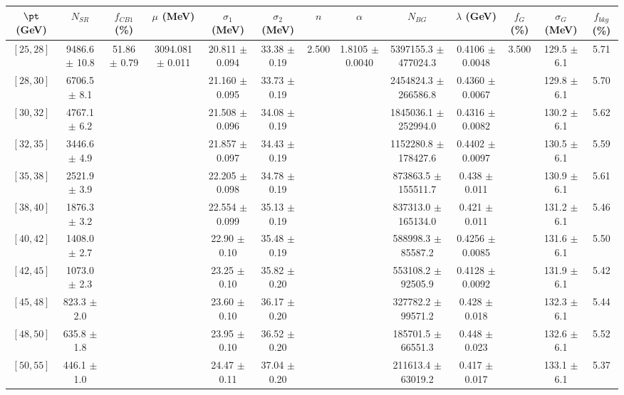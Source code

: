 \begin{tabular}{c||c|c|c|c|c|c|c|c|c|c|c||c}
$\pt$ (GeV) & $N_{SR}$ & $f_{CB1}$ (\%) & $\mu$ (MeV) & $\sigma_1$ (MeV) & $\sigma_2$ (MeV) & $n$ & $\alpha$ & $N_{BG}$ & $\lambda$ (GeV) & $f_G$ (\%) & $\sigma_G$ (MeV) & $f_{bkg}$ (\%) \\
\hline
$[25, 28]$ & 9486.6 $\pm$ 10.8 & \multirow{19}{*}{51.86 $\pm$ 0.79} & \multirow{19}{*}{3094.081 $\pm$ 0.011} & 20.811 $\pm$ 0.094 & 33.38 $\pm$ 0.19 & \multirow{19}{*}{2.500} & \multirow{19}{*}{1.8105 $\pm$ 0.0040} & 5397155.3 $\pm$ 477024.3 & 0.4106 $\pm$ 0.0048 & \multirow{19}{*}{3.500} & 129.5 $\pm$ 6.1 & 5.71\\
$[28, 30]$ & 6706.5 $\pm$ 8.1 &  &  & 21.160 $\pm$ 0.095 & 33.73 $\pm$ 0.19 &  &  & 2454824.3 $\pm$ 266586.8 & 0.4360 $\pm$ 0.0067 &  & 129.8 $\pm$ 6.1 & 5.70\\
$[30, 32]$ & 4767.1 $\pm$ 6.2 &  &  & 21.508 $\pm$ 0.096 & 34.08 $\pm$ 0.19 &  &  & 1845036.1 $\pm$ 252994.0 & 0.4316 $\pm$ 0.0082 &  & 130.2 $\pm$ 6.1 & 5.62\\
$[32, 35]$ & 3446.6 $\pm$ 4.9 &  &  & 21.857 $\pm$ 0.097 & 34.43 $\pm$ 0.19 &  &  & 1152280.8 $\pm$ 178427.6 & 0.4402 $\pm$ 0.0097 &  & 130.5 $\pm$ 6.1 & 5.59\\
$[35, 38]$ & 2521.9 $\pm$ 3.9 &  &  & 22.205 $\pm$ 0.098 & 34.78 $\pm$ 0.19 &  &  & 873863.5 $\pm$ 155511.7 & 0.438 $\pm$ 0.011 &  & 130.9 $\pm$ 6.1 & 5.61\\
$[38, 40]$ & 1876.3 $\pm$ 3.2 &  &  & 22.554 $\pm$ 0.099 & 35.13 $\pm$ 0.19 &  &  & 837313.0 $\pm$ 165134.0 & 0.421 $\pm$ 0.011 &  & 131.2 $\pm$ 6.1 & 5.46\\
$[40, 42]$ & 1408.0 $\pm$ 2.7 &  &  & 22.90 $\pm$ 0.10 & 35.48 $\pm$ 0.19 &  &  & 588998.3 $\pm$ 85587.2 & 0.4256 $\pm$ 0.0085 &  & 131.6 $\pm$ 6.1 & 5.50\\
$[42, 45]$ & 1073.0 $\pm$ 2.3 &  &  & 23.25 $\pm$ 0.10 & 35.82 $\pm$ 0.20 &  &  & 553108.2 $\pm$ 92505.9 & 0.4128 $\pm$ 0.0092 &  & 131.9 $\pm$ 6.1 & 5.42\\
$[45, 48]$ & 823.3 $\pm$ 2.0 &  &  & 23.60 $\pm$ 0.10 & 36.17 $\pm$ 0.20 &  &  & 327782.2 $\pm$ 99571.2 & 0.428 $\pm$ 0.018 &  & 132.3 $\pm$ 6.1 & 5.44\\
$[48, 50]$ & 635.8 $\pm$ 1.8 &  &  & 23.95 $\pm$ 0.10 & 36.52 $\pm$ 0.20 &  &  & 185701.5 $\pm$ 66551.3 & 0.448 $\pm$ 0.023 &  & 132.6 $\pm$ 6.1 & 5.52\\
$[50, 55]$ & 446.1 $\pm$ 1.0 &  &  & 24.47 $\pm$ 0.11 & 37.04 $\pm$ 0.20 &  &  & 211613.4 $\pm$ 63019.2 & 0.417 $\pm$ 0.017 &  & 133.1 $\pm$ 6.1 & 5.37\\

\end{tabular}
